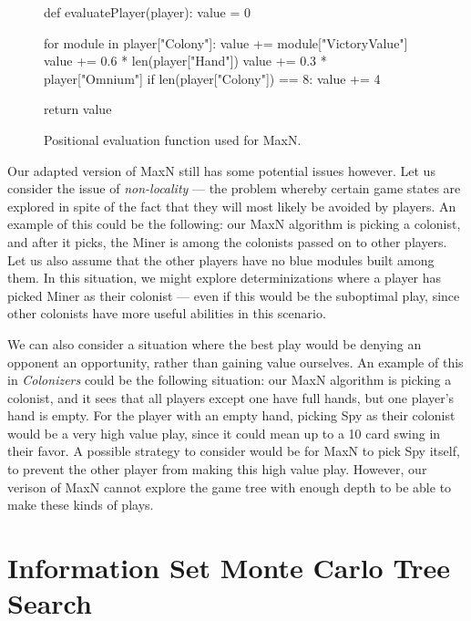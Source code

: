 \begin{figure}[hb]
\begin{code}[commandchars=\\\{\},codes={\catcode`\$=3\catcode`\^=7\catcode`\_=8}]
def evaluatePlayer(player):
    value = 0

    for module in player["Colony"]:
        value += module["VictoryValue"]
    value += 0.6 * len(player["Hand"])
    value += 0.3 * player["Omnium"]
    if len(player["Colony"]) == 8:
        value += 4

    return value
\end{code}
\caption{Positional evaluation function used for MaxN.}\label{algo:maxneval}
\end{figure}

Our adapted version of MaxN still has some potential issues however.
Let us consider the issue of \emph{non-locality} --- the problem whereby
certain game states are explored in spite of the fact that they will
most likely be avoided by players. An example of this could be the following:
our MaxN algorithm is picking a colonist, and after it picks, the Miner is among
the colonists passed on to other players. Let us also assume that the other players
have no blue modules built among them. In this situation,
we might explore determinizations where a player has picked Miner as their colonist
--- even if this would be the suboptimal play, since other colonists
have more useful abilities in this scenario.

We can also consider a situation where the best play would be denying an opponent
an opportunity, rather than gaining value ourselves. An example of this in
\emph{Colonizers} could be the following situation: our MaxN algorithm is picking
a colonist, and it sees that all players except one have full hands, but one
player's hand is empty. For the player with an empty hand, picking Spy as their
colonist would be a very high value play, since it could mean up to a 10 card swing
in their favor. A possible strategy to consider would be for MaxN to pick Spy itself,
to prevent the other player from making this high value play. However, our verison
of MaxN cannot explore the game tree with enough depth to be able to make these
kinds of plays.

\section{Information Set Monte Carlo Tree Search}
\label{sec:algoismcts}

